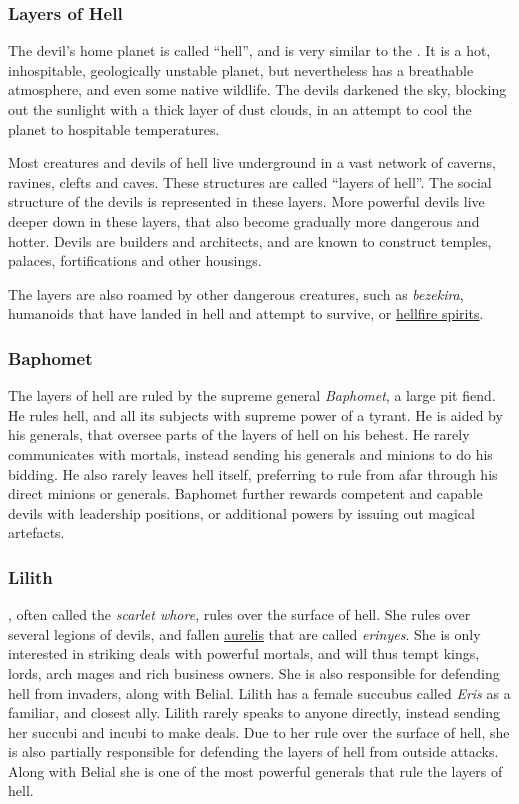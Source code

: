 \subsubsection{Layers of Hell}
\label{sec:Layers of Hell}

The devil's home planet is called ``hell'', and is very similar to the
. It is a hot, inhospitable, geologically unstable planet,
but nevertheless has a breathable atmosphere, and even some native
wildlife. The devils darkened the sky, blocking out the sunlight with a thick
layer of dust clouds, in an attempt to cool the planet to hospitable
temperatures.

Most creatures and devils of hell live underground in a vast network of
caverns, ravines, clefts and caves. These structures are called ``layers of
hell''. The social structure of the devils is represented in these layers.
More powerful devils live deeper down in these layers, that also become
gradually more dangerous and hotter. Devils are builders and architects, and
are known to construct temples, palaces, fortifications and other housings.

The layers are also roamed by other dangerous creatures, such as
\emph{bezekira}, humanoids that have landed in hell and attempt to survive,
or \hyperref[sec:monster:Hellfire Spirit]{hellfire spirits}.

\subsubsection{Baphomet}
\label{sec:Baphomet}

The layers of hell are ruled by the supreme general \emph{Baphomet}, a large
pit fiend. He rules hell, and all its subjects with supreme power of a
tyrant. He is aided by his generals, that oversee parts of the layers of
hell on his behest. He rarely communicates with mortals, instead sending his
generals and minions to do his bidding. He also rarely leaves hell itself,
preferring to rule from afar through his direct minions or generals. Baphomet
further rewards competent and capable devils with leadership positions, or
additional powers by issuing out magical artefacts.

\subsubsection{Lilith}

, often called the \emph{scarlet whore}, rules over the
surface of hell. She rules over several legions of devils, and fallen
\hyperref[sec:Aurelis]{aurelis} that are called \emph{erinyes}. She is only
interested in striking deals with powerful mortals, and will thus tempt kings,
lords, arch mages and rich business owners. She is also responsible for
defending hell from invaders, along with Belial. Lilith has a female succubus
called \emph{Eris} as a familiar, and closest ally. Lilith rarely speaks to
anyone directly, instead sending her succubi and incubi to make deals. Due
to her rule over the surface of hell, she is also partially responsible for
defending the layers of hell from outside attacks. Along with Belial she is
one of the most powerful generals that rule the layers of hell.

